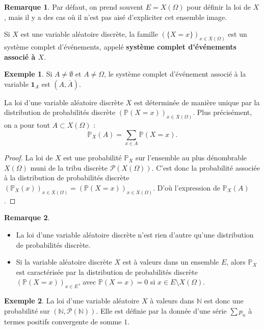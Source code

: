 \documentclass[french]{article}
\renewcommand{\P}{\mathbb{P}}
\newcommand{\N}{\mathbb{N}}
\theoremstyle{plain}
\theoremstyle{definition}
\newtheorem*{ex}{Exemple}
\newtheorem*{rmq}{Remarque}
\theoremstyle{remark}
\begin{document}
\begin{rmq}
	Par défaut, on prend souvent $E=X(\Omega)$ pour définir la loi de $X$, mais il y a des cas où il n'est pas aisé d'expliciter cet ensemble image.
\end{rmq}

\begin{prop}%
	Si $X$ est une variable aléatoire discrète, la famille $(\{X=x\})_{x\in X(\Omega)}$ est un système complet d'événements, appelé \textbf{système complet d'événements associé à $X$}.
\end{prop}

\begin{ex}
	Si $A\ne\emptyset$ et $A\ne\Omega$, le système complet d'événement associé à la variable $\textbf{1}_A$ est $(A,\overline{A})$.
\end{ex}

\begin{prop}%
	La loi d'une variable aléatoire discrète $X$ est déterminée de manière unique par la distribution de probabilités discrète $(\P(X=x))_{x\in X(\Omega)}$. Plus précisément, on a pour tout $A\subset X(\Omega)$ :
	$$\P_X(A)=\sum_{x\in A}\P(X=x).$$
\end{prop}

\begin{proof}
	La loi de $X$ est une probabilité $\P_X$ sur l'ensemble au plus dénombrable $X(\Omega)$ muni de la tribu discrète $\mathcal{P}(X(\Omega))$. C'est donc la probabilité associée à la distribution de probabilités discrète $(\P_X(x))_{x\in X(\Omega)}=(\P(X=x))_{x\in X(\Omega)}$. D'où l'expression de $\P_X(A)$.
\end{proof}

\begin{rmq}
	\begin{itemize}
		\item La loi d'une variable aléatoire discrète n'est rien d'autre qu'une distribution de probabilités discrète.
		\item Si la variable aléatoire discrète $X$ est à valeurs dans un ensemble $E$, alors $\P_X$ est caractérisée par la distribution de probabilités discrète $(\P(X=x))_{x\in E}$, avec $\P(X=x)=0$ si $x\in E\setminus X(\Omega)$.
	\end{itemize}
\end{rmq}

\begin{ex}
	La loi d'une variable aléatoire $X$ à valeurs dans $\N$ est donc une probabilité sur $(\N,\mathcal{P}(\N))$. Elle est définie par la donnée d'une série $\displaystyle\sum p_n$ à termes positifs convergente de somme $1$.
\end{ex}
\end{document}
